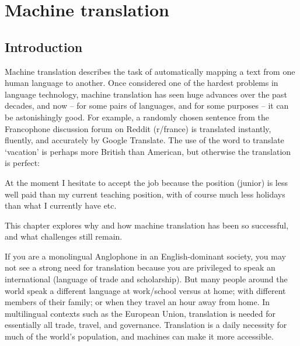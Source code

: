 \chapter{Machine translation}
\label{ch:mt}
   
\section{Introduction}



Machine translation describes the task of automatically mapping a text from one human language to another.  Once considered one of the hardest problems in language technology, machine translation has seen huge advances over the past decades, and now -- for some pairs of languages, and  for some purposes -- it can be astonishingly good.   For example, a randomly chosen sentence  from the Francophone discussion forum on Reddit (r/france) is translated instantly, fluently, and accurately  by Google Translate.  The use of the word  to translate  `vacation' is perhaps more British than American, but otherwise the translation is perfect:


\ea \label{frenchjob} 

\ex \label{englishjob} At the moment I hesitate to accept the job because the position (junior) is less well paid than my current teaching position, with of course much less holidays than what I currently have etc.

\z 


This chapter explores why and how machine translation has been so successful, and what challenges still remain.

If you are a monolingual Anglophone in an English-dominant society, you may not see a strong need for translation because you are privileged to speak an international  (language of trade and scholarship).  But many people around the world  speak a different language at work/school versus at home; with different members of their family; or when they travel an hour away from home.  In multilingual contexts such as the European Union, translation is needed for essentially all trade, travel, and governance.  Translation is a daily necessity for much of the world's population, and machines can make it more accessible.

